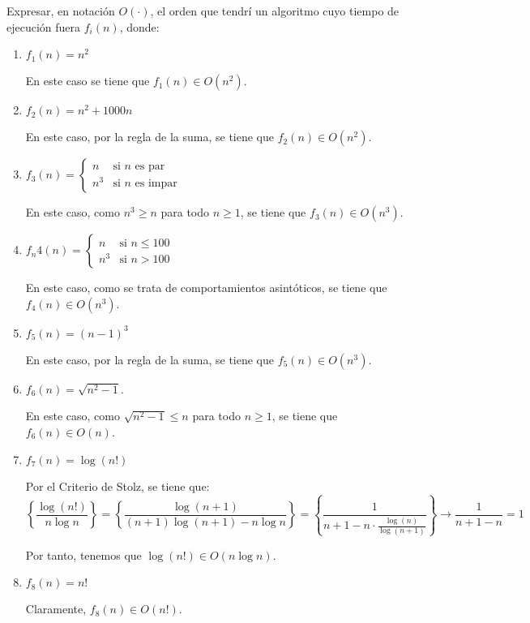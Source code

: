 \begin{ejercicio}
    Expresar, en notación $O(\cdot)$, el orden que tendrí un algoritmo cuyo tiempo de ejecución fuera $f_i(n)$, donde:
    \begin{enumerate}
        \item $f_1(n) = n^2$
        
        En este caso se tiene que $f_1(n)\in O(n^2)$.
        \item $f_2(n) = n^2+1000n$
        
        En este caso, por la regla de la suma, se tiene que $f_2(n)\in O(n^2)$.

        \item $f_3(n) = \begin{cases}
            n & \text{si } n \text{ es par} \\
            n^3 & \text{si } n \text{ es impar}
        \end{cases}$

        En este caso, como $n^3\geq n$ para todo $n\geq 1$, se tiene que $f_3(n)\in O(n^3)$.
        \item $f_n4(n)=\begin{cases}
            n & \text{si } n\leq 100 \\
            n^3 & \text{si } n > 100
        \end{cases}$

        En este caso, como se trata de comportamientos asintóticos, se tiene que $f_4(n)\in O(n^3)$.

        \item $f_5(n) = (n-1)^3$
        
        En este caso, por la regla de la suma, se tiene que $f_5(n)\in O(n^3)$.
        \item $f_6(n) = \sqrt{n^2-1}$.
        
        En este caso, como $\sqrt{n^2-1}\leq n$ para todo $n\geq 1$, se tiene que $f_6(n)\in O(n)$.

        \item $f_7(n) = \log(n!)$
        
        Por el Criterio de Stolz, se tiene que:
        \begin{equation*}
            \left\{\frac{\log(n!)}{n \log n}\right\}
            = \left\{\frac{\log(n+1)}{(n+1)\log(n+1)-n\log n}\right\}
            = \left\{\frac{1}{n+1-n\cdot \frac{\log(n)}{\log(n+1)}}\right\} \to \frac{1}{n+1-n}=1
        \end{equation*}

        Por tanto, tenemos que $\log(n!)\in O(n\log n)$.

        \item $f_8(n) = n!$
        
        Claramente, $f_8(n)\in O(n!)$.
    \end{enumerate}
\end{ejercicio}


